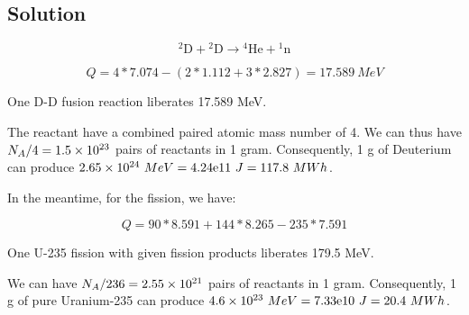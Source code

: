 \subsection{Solution}

\begin{equation}
{}^2\textrm{D} + {}^2\textrm{D} \to {}^{4}\textrm{He} + {}^1\textrm{n}
\end{equation}


\begin{equation}
Q = 4*7.074 - (2*1.112+3*2.827) = 17.589\ {MeV}
\end{equation}

One D-D fusion reaction liberates 17.589 MeV.

The reactant have a combined paired atomic mass number of 4. We can thus have $N_A / 4 = \text{\num{1.5e23}}$ pairs of reactants in 1 gram. Consequently, 1 g of Deuterium can produce $\text{\num{2.65e24}}\ {MeV} = \text{4.24e11}\ J = 117.8\ {MWh}$.

In the meantime, for the fission, we have:

\begin{equation}
Q = 90*8.591 + 144*8.265 - 235*7.591
\end{equation}

One U-235 fission with given fission products liberates 179.5 MeV.

We can have $N_A / 236 = \text{\num{2.55e21}}$ pairs of reactants in 1 gram. Consequently, 1 g of pure Uranium-235 can produce $\text{\num{4.6e23}}\ {MeV} = \text{7.33e10}\ J = 20.4\ {MWh}$.
